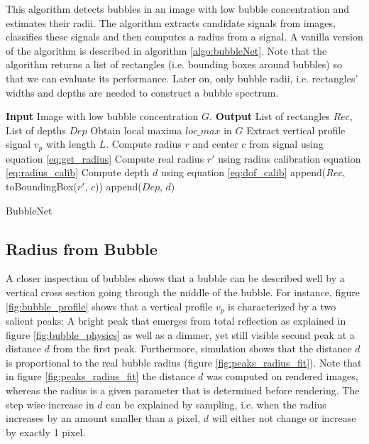 	This algorithm detects bubbles in an image with low bubble concentration and estimates their radii. The algorithm extracts candidate signals from images, classifies these signals and then computes a radius from a signal. A vanilla version of the algorithm is described in algorithm \ref{algo:bubbleNet}. Note that the algorithm returns a list of rectangles (i.e. bounding boxes around bubbles) so that we can evaluate its performance. Later on, only bubble radii, i.e. rectangles' widths and depths are needed to construct a bubble spectrum. 
	
			\begin{algorithm}
			\begin{algorithmic}[1]
				\State \textbf{Input} Image with low bubble concentration $G$. 
				\State \textbf{Output} List of rectangles $Rec$, List of depths $Dep$
				\State Obtain local maxima $loc\_max$ in $G$
					\State Extract vertical profile signal $v_p$ with length $L$.
						\State Compute radius $r$ and center $c$ from signal using equation \ref{eq:get_radius}
						\State Compute real radius $r'$ using radius calibration equation \ref{eq:radius_calib}
						\State Compute depth $d$ using equation \ref{eq:dof_calib}
						\State append($Rec$, toBoundingBox($r'$, $c$))
						\State append($Dep$, $d$)
					\EndIf
				\EndFor
			\end{algorithmic}
			
			\caption{BubbleNet}
			\label{algo:bubbleNet}
		\end{algorithm}
	
	\subsection{Radius from Bubble}
	
	A closer inspection of bubbles shows that a bubble can be described well by a vertical cross section going through the middle of the bubble. For instance, figure \ref{fig:bubble_profile} shows that a vertical profile $v_p$ is characterized by a two salient peaks: A bright peak that emerges from total reflection as explained in figure \ref{fig:bubble_physics} as well as a dimmer, yet still visible second peak at a distance $d$ from the first peak. Furthermore, simulation shows that the distance $d$ is proportional to the real bubble radius (figure \ref{fig:peaks_radius_fit}). Note that in figure \ref{fig:peaks_radius_fit} the distance $d$ was computed on rendered images, whereas the radius is a given parameter that is determined before rendering. The step wise increase in $d$ can be explained by sampling, i.e. when the radius increases by an amount smaller than a pixel, $d$ will either not change or increase by exactly 1 pixel.
	
